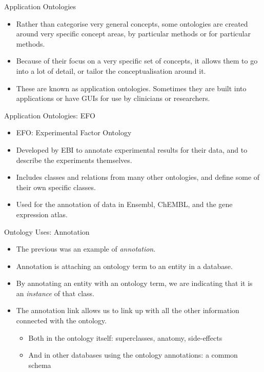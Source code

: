\documentclass[aspectratio=169]{beamer} %
\begin{document}
\begin{frame}{Application Ontologies}
  \begin{itemize}
    \item Rather than categorise very general concepts, some ontologies are
    created around very specific concept areas, by particular methods or for
    particular methods.
    \item Because of their focus on a very specific set of concepts, it allows them to go into a lot of detail, or tailor the conceptualisation around it.
    \item These are known as application ontologies. Sometimes they are built
    into applications or have GUIs for use by clinicians or researchers. 
  \end{itemize}
\end{frame}

\begin{frame}{Application Ontologies: EFO}
  \begin{itemize}
    \item EFO: Experimental Factor Ontology
    \item Developed by EBI to annotate experimental results for their data, and
    to describe the experiments themselves.
    \item Includes classes and relations from many other ontologies, and define
    some of their own specific classes.
    \item Used for the annotation of data in Ensembl, ChEMBL, and the gene
    expression atlas. 
  \end{itemize}
\end{frame}

\begin{frame}{Ontology Uses: Annotation}
  \begin{itemize}
    \item The previous was an example of \emph{annotation}.
    \item Annotation is attaching an ontology term to an entity in a database.
    \item By annotating an entity with an ontology term, we are indicating that it is an \emph{instance} of that class.
    \item The annotation link allows us to link up with all the other information connected with the ontology.
    \begin{itemize}
      \item Both in the ontology itself: superclasses, anatomy, side-effects
      \item And in other databases using the ontology annotations: a common schema
    \end{itemize}
  \end{itemize}
\end{frame}
\end{document}
